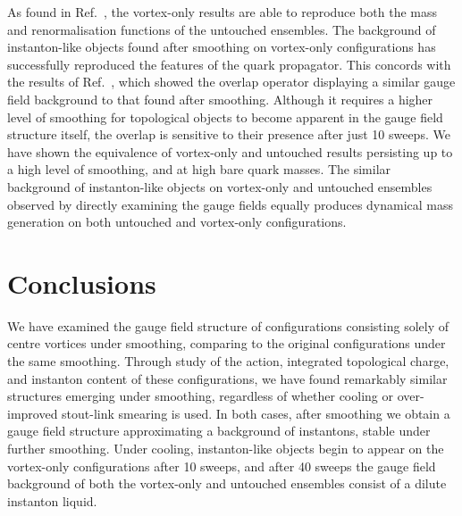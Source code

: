 \documentclass[
 reprint,
 amsmath,amssymb,
 aps,
prd,
]{revtex4-1}
\begin{document}
As found in Ref.~\cite{Trewartha:2015nna}, the vortex-only results are able to reproduce both the mass and renormalisation functions of the untouched ensembles. The background of instanton-like objects found after smoothing on vortex-only configurations has successfully reproduced the features of the quark propagator. This concords with the results of Ref.~\cite{Ilgenfritz:2008ia}, which showed the overlap operator displaying a similar gauge field background to that found after smoothing. Although it requires a higher level of smoothing for topological objects to become apparent in the gauge field structure itself, the overlap is sensitive to their presence after just 10 sweeps. We have shown the equivalence of vortex-only and untouched results persisting up to a high level of smoothing, and at high bare quark masses. The similar background of instanton-like objects on vortex-only and untouched ensembles observed by directly examining the gauge fields equally produces dynamical mass generation on both untouched and vortex-only configurations.

\section{Conclusions}
\label{sec:conc}

We have examined the gauge field structure of configurations consisting solely of centre vortices under smoothing, comparing to the original configurations under the same smoothing. Through study of the action, integrated topological charge, and instanton content of these configurations, we have found remarkably similar structures emerging under smoothing, regardless of whether cooling or over-improved stout-link smearing is used. In both cases, after smoothing we obtain a gauge field structure approximating a background of instantons, stable under further smoothing. Under cooling, instanton-like objects begin to appear on the vortex-only configurations after 10 sweeps, and after 40 sweeps the gauge field background of both the vortex-only and untouched ensembles consist of a dilute instanton liquid.
\end{document}
